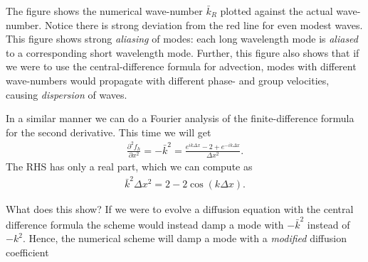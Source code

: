 \documentclass[12pt]{article}
\theoremstyle{definition}
\theoremstyle{definition}
\theoremstyle{definition}
\begin{document}
The figure shows the numerical wave-number $\bar{k}_R$ plotted against
the actual wave-number. Notice there is strong deviation from the red
line for even modest waves. This figure shows strong \emph{aliasing}
of modes: each long wavelength mode is \emph{aliased} to a
corresponding short wavelength mode. Further, this figure also shows
that if we were to use the central-difference formula for advection,
modes with different wave-numbers would propagate with different
phase- and group velocities, causing \emph{dispersion} of waves.

In a similar manner we can do a Fourier analysis of the
finite-difference formula for the second derivative. This time we will
get
\begin{align}
  \frac{\partial ^2f_h}{\partial x^2}
  =
  -\bar{k}^2 = \frac{e^{ik \Delta x } - 2 + e^{-ik \Delta x } }{\Delta x^2}.
\end{align}
The RHS has only a real part, which we can compute as
\begin{align}
  \bar{k}^2\Delta x^2 = 2 - 2 \cos(k \Delta x).
\end{align}

What does this show? If we were to evolve a diffusion equation with
the central difference formula the scheme would instead damp a mode
with $-\bar{k}^2$ instead of $-k^2$. Hence, the numerical scheme will
damp a mode with a \emph{modified} diffusion coefficient
\end{document}
